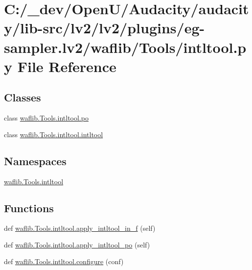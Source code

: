 \hypertarget{lv2_2plugins_2eg-sampler_8lv2_2waflib_2_tools_2intltool_8py}{}\section{C\+:/\+\_\+dev/\+Open\+U/\+Audacity/audacity/lib-\/src/lv2/lv2/plugins/eg-\/sampler.lv2/waflib/\+Tools/intltool.py File Reference}
\label{lv2_2plugins_2eg-sampler_8lv2_2waflib_2_tools_2intltool_8py}
\subsection*{Classes}
\begin{DoxyCompactItemize}
\item 
class \hyperlink{classwaflib_1_1_tools_1_1intltool_1_1po}{waflib.\+Tools.\+intltool.\+po}
\item 
class \hyperlink{classwaflib_1_1_tools_1_1intltool_1_1intltool}{waflib.\+Tools.\+intltool.\+intltool}
\end{DoxyCompactItemize}
\subsection*{Namespaces}
\begin{DoxyCompactItemize}
\item 
 \hyperlink{namespacewaflib_1_1_tools_1_1intltool}{waflib.\+Tools.\+intltool}
\end{DoxyCompactItemize}
\subsection*{Functions}
\begin{DoxyCompactItemize}
\item 
def \hyperlink{namespacewaflib_1_1_tools_1_1intltool_aa64909ee30db7f6c262eb9c6bacc5f08}{waflib.\+Tools.\+intltool.\+apply\+\_\+intltool\+\_\+in\+\_\+f} (self)
\item 
def \hyperlink{namespacewaflib_1_1_tools_1_1intltool_a8e47eb8e5671c4d3f18cdb788a5868b6}{waflib.\+Tools.\+intltool.\+apply\+\_\+intltool\+\_\+po} (self)
\item 
def \hyperlink{namespacewaflib_1_1_tools_1_1intltool_a6e857d8fd69986194be76352936c4db1}{waflib.\+Tools.\+intltool.\+configure} (conf)
\end{DoxyCompactItemize}

